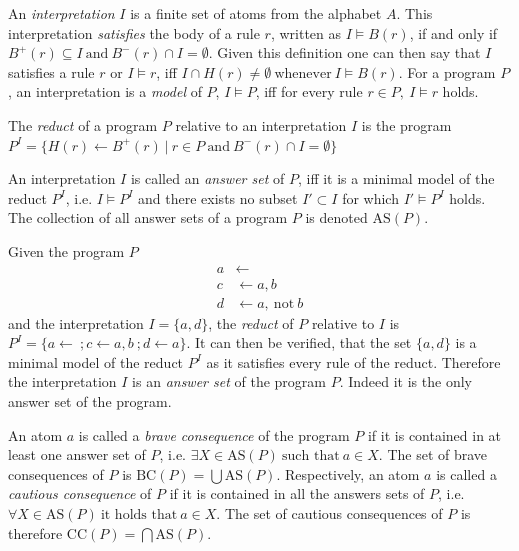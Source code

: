 An \emph{interpretation} $I$ is a finite set of atoms from the alphabet $A$. This interpretation \emph{satisfies} the body of a rule $r$, written as \(I \models B(r)\), if and only if \(B^+(r) \subseteq I\ \text{and}\ B^-(r) \cap I = \emptyset\). Given this definition one can then say that $I$ satisfies a rule $r$ or \(I \models r\), iff \(I \cap H(r) \neq \emptyset \ \text{whenever}\ I \models B(r)\). For a program $P$, an interpretation is a \emph{model} of $P$, \(I \models P\), iff for every rule \(r \in P,\ I \models r\) holds.
\begin{definition}
\label{def:reduct}
    The \emph{reduct} of a program $P$ relative to an interpretation $I$ is the program \(P^I = \{ H(r) \leftarrow B^+(r) \ | \ r \in P \ \text{and} \ B^-(r) \cap I = \emptyset\}\) \cite{GL88}
\end{definition}
An interpretation $I$ is called an \emph{answer set} of $P$, iff it is a minimal model of the reduct \(P^I\), i.e. \(I \models P^I \) and there exists no subset \( I' \subset I \) for which \( I' \models P^{I}\) holds. The collection of all answer sets of a program $P$ is denoted \(\text{AS}(P)\).
\begin{example}
\label{ex:reduct}
    Given the program $P$
    \begin{align*}
        a &\leftarrow \\
        c &\leftarrow a, b \\
        d &\leftarrow a,\ \text{not}\ b
    \end{align*}
    and the interpretation \(I = \{a, d\}\), the \emph{reduct} of $P$ relative to $I$ is \(P^I = \{a \leftarrow\ ; c \leftarrow a, b\ ; d \leftarrow a\}\). It can then be verified, that the set \(\{a,d\}\) is a minimal model of the reduct \(P^I\) as it satisfies every rule of the reduct. Therefore the interpretation $I$ is an \emph{answer set} of the program $P$. Indeed it is the only answer set of the program.
\end{example}
An atom $a$ is called a \emph{brave consequence} of the program $P$ if it is contained in at least one answer set of $P$, i.e. \(\exists X \in \text{AS}(P) \ \text{such that}\ a \in X\). The set of brave consequences of $P$ is \(\text{BC}(P) = \bigcup \text{AS}(P)\).
Respectively, an atom $a$ is called a \emph{cautious consequence} of $P$ if it is contained in all the answers sets of $P$, i.e. \(\forall X \in \text{AS}(P) \ \text{it holds that}\ a \in X\). The set of cautious consequences of $P$ is therefore \(\text{CC}(P) = \bigcap \text{AS}(P)\).

